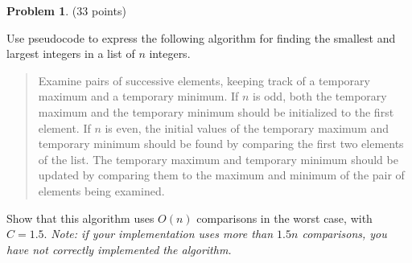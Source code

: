 \documentclass{article}
\theoremstyle{definition}
\newtheorem{problem}{Problem}
\begin{document}
\begin{problem}(33 points)
\begin{compactenum}
\item Use pseudocode to express the following algorithm for finding the smallest and largest integers in a list of $n$ integers.
\begin{quote}
Examine pairs of successive elements, keeping track of a temporary maximum and a temporary minimum.  If $n$ is odd, both the temporary maximum and the temporary minimum should be initialized to the first element.  If $n$ is even, the initial values of the temporary maximum and temporary minimum should be found by comparing the first two elements of the list.  The temporary maximum and temporary minimum should be updated by comparing them to the maximum and minimum of the pair of elements being examined.
\end{quote}
\item Show that this algorithm uses $O(n)$ comparisons in the worst case, with $C=1.5$. \textit{Note: if your implementation uses more than $1.5n$ comparisons, you have not correctly implemented the algorithm.}
\end{compactenum}
\end{problem}
\end{document}
